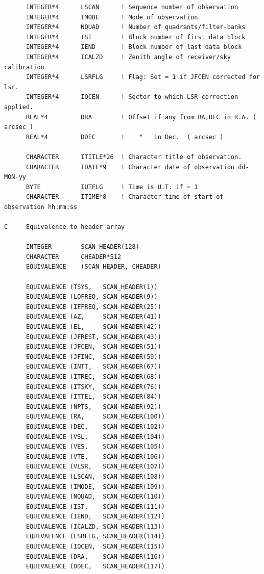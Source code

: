 \documentclass[11pt,twoside]{report}
\begin{document}
\begin{verbatim}
      INTEGER*4      LSCAN      ! Sequence number of observation
      INTEGER*4      IMODE      ! Mode of observation
      INTEGER*4      NQUAD      ! Number of quadrants/filter-banks
      INTEGER*4      IST        ! Block number of first data block
      INTEGER*4      IEND       ! Block number of last data block
      INTEGER*4      ICALZD     ! Zenith angle of receiver/sky calibration
      INTEGER*4      LSRFLG     ! Flag: Set = 1 if JFCEN corrected for lsr.
      INTEGER*4      IQCEN      ! Sector to which LSR correction applied.
      REAL*4         DRA        ! Offset if any from RA,DEC in R.A. ( arcsec )
      REAL*4         DDEC       !    "   in Dec.  ( arcsec )

      CHARACTER      ITITLE*26  ! Character title of observation.
      CHARACTER      IDATE*9    ! Character date of observation dd-MON-yy
      BYTE           IUTFLG     ! Time is U.T. if = 1
      CHARACTER      ITIME*8    ! Character time of start of observation hh:mm:ss

C     Equivalence to header array

      INTEGER        SCAN_HEADER(128)
      CHARACTER      CHEADER*512
      EQUIVALENCE    (SCAN_HEADER, CHEADER)

      EQUIVALENCE (TSYS,   SCAN_HEADER(1))
      EQUIVALENCE (LOFREQ, SCAN_HEADER(9))
      EQUIVALENCE (IFFREQ, SCAN_HEADER(25))
      EQUIVALENCE (AZ,     SCAN_HEADER(41))
      EQUIVALENCE (EL,     SCAN_HEADER(42))
      EQUIVALENCE (JFREST, SCAN_HEADER(43))
      EQUIVALENCE (JFCEN,  SCAN_HEADER(51))
      EQUIVALENCE (JFINC,  SCAN_HEADER(59))
      EQUIVALENCE (INTT,   SCAN_HEADER(67))
      EQUIVALENCE (ITREC,  SCAN_HEADER(68))
      EQUIVALENCE (ITSKY,  SCAN_HEADER(76))
      EQUIVALENCE (ITTEL,  SCAN_HEADER(84))
      EQUIVALENCE (NPTS,   SCAN_HEADER(92))
      EQUIVALENCE (RA,     SCAN_HEADER(100))
      EQUIVALENCE (DEC,    SCAN_HEADER(102))
      EQUIVALENCE (VSL,    SCAN_HEADER(104))
      EQUIVALENCE (VES,    SCAN_HEADER(105))
      EQUIVALENCE (VTE,    SCAN_HEADER(106))
      EQUIVALENCE (VLSR,   SCAN_HEADER(107))
      EQUIVALENCE (LSCAN,  SCAN_HEADER(108))
      EQUIVALENCE (IMODE,  SCAN_HEADER(109))
      EQUIVALENCE (NQUAD,  SCAN_HEADER(110))
      EQUIVALENCE (IST,    SCAN_HEADER(111))
      EQUIVALENCE (IEND,   SCAN_HEADER(112))
      EQUIVALENCE (ICALZD, SCAN_HEADER(113))
      EQUIVALENCE (LSRFLG, SCAN_HEADER(114))
      EQUIVALENCE (IQCEN,  SCAN_HEADER(115))
      EQUIVALENCE (DRA,    SCAN_HEADER(116))
      EQUIVALENCE (DDEC,   SCAN_HEADER(117))


\end{verbatim}
\end{document}
